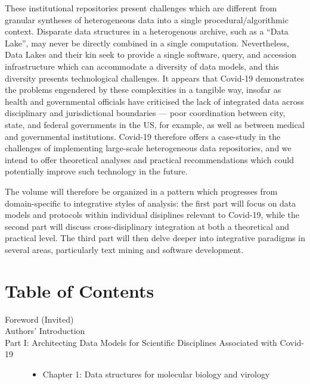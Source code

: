 \documentclass{statsoc}
\newcommand{\p}[1]{

\vspace{.75em}#1}
\newcommand{\q}[1]{{\fontfamily{qcr}\selectfont ``}#1{\fontfamily{qcr}\selectfont ''}}
\begin{document}
{\p{These institutional repositories present 
challenges which are different from granular 
syntheses of heterogeneous data into a single 
procedural/algorithmic context.  Disparate data structures 
in a heterogenous archive, such as a \q{Data Lake}, may 
never be directly combined in a single computation.  
Nevertheless, Data Lakes and their kin seek to 
provide a single software, query, and accession infrastructure 
which can accommodate a diversity of data models, and 
this diversity presents technological challenges.  
It appears that Covid-19 demonstrates the problems 
engendered by these complexities in a tangible way, 
insofar as health and governmental officials have criticised 
the lack of integrated data across disciplinary and 
jurisdictional boundaries --- poor coordination between 
city, state, and federal governments in the US, for 
example, as well as between medical and governmental institutions.  
Covid-19 therefore offers a case-study in the challenges 
of implementing large-scale heterogeneous data repositories, 
and we intend to offer theoretical analyses and practical 
recommendations which could potentially improve such 
technology in the future.} 

\p{The volume will therefore be organized in a pattern 
which progresses from domain-specific to integrative 
styles of analysis: the first part will focus on data 
models and protocols within individual disiplines 
relevant to Covid-19, while the second part will discuss 
cross-disiplinary integration at both a theoretical and 
practical level.  The third part will then delve deeper 
into integrative paradigms in several areas, particularly 
text mining and software development.}  

\section{Table of Contents}

\begin{description}

\item[Foreword (Invited)]

\item[Authors' Introduction]

\item[Part I: Architecting Data Models for Scientific Disciplines Associated with Covid-19]

\begin{itemize}
\item Chapter 1: Data structures for molecular biology and virology


\end{itemize}
\end{description}}
\end{document}
